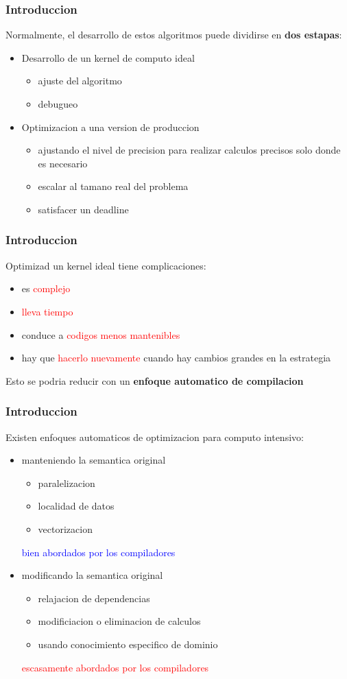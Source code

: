 \documentclass{beamer}\usetheme{Madrid} %
\begin{document}
\begin{frame}
\frametitle{Introduccion}
Normalmente, el desarrollo de estos 
algoritmos puede dividirse en \textbf{dos estapas}:
\begin{itemize}
\item Desarrollo de un kernel de computo ideal
	\begin{itemize} 
	\item ajuste del algoritmo
	\item debugueo
	\end{itemize}
\item Optimizacion a una version de produccion
	\begin{itemize}
	\item ajustando el nivel de precision para realizar calculos
	precisos solo donde es necesario
	\item escalar al tamano real del problema
	\item satisfacer un deadline
	\end{itemize}
\end{itemize}
\end{frame}
\begin{frame}
\frametitle{Introduccion}
Optimizad un kernel ideal tiene complicaciones: 
\begin{itemize} 
\item es \textcolor{red}{complejo}
\item \textcolor{red}{lleva tiempo}
\item conduce a \textcolor{red}{codigos menos mantenibles}
\item hay que \textcolor{red}{hacerlo nuevamente} cuando hay cambios grandes en la estrategia
\end{itemize}
Esto se podria reducir con un \textbf{enfoque automatico de compilacion}
\end{frame}
\begin{frame}
\frametitle{Introduccion}
	Existen enfoques automaticos de optimizacion para computo intensivo:
	\begin{itemize}
	\item manteniendo la semantica original
	\begin{itemize}
		\item paralelizacion
		\item localidad de datos
		\item vectorizacion
	\end{itemize}
	\textcolor{blue}{bien abordados por los compiladores}
	\item modificando la semantica original
	\begin{itemize}
		\item relajacion de dependencias
		\item modificiacion o eliminacion de calculos
		\item usando conocimiento especifico de dominio 
	\end{itemize} 
	\textcolor{red}{escasamente abordados por los compiladores}
	\end{itemize}
\end{frame}
\end{document}
